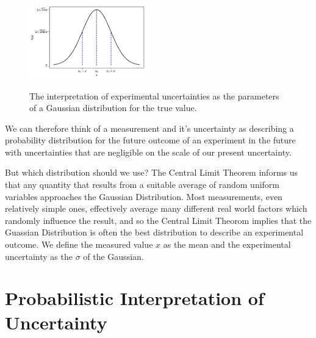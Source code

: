 \documentclass[12pt,oneside]{book}
\begin{document}
\begin{figure}[htbp]
\begin{center}
{\includegraphics[width=0.45\textwidth]{figs/stdunc.pdf}}
\end{center}
\caption{\label{fig:stdunc}  The interpretation of experimental uncertainties as the parameters of a Gaussian distribution for the true value.}
\end{figure}

We can therefore think of a measurement and it's uncertainty as
describing a probability distribution for the future outcome of an
experiment in the future with uncertainties that are negligible on the
scale of our present uncertainty.

But which distribution should we use?  The Central Limit Theorem
informs us that any quantity that results from a suitable average of
random uniform variables approaches the Gaussian Distribution.  Most
measurements, even relatively simple ones, effectively average many
different real world factors which randomly influence the result, and
so the Central Limit Theorom implies that the Guassian Distribution is
often the best distribution to describe an experimental outcome.  We
define the measured value $x$ as the mean and the experimental
uncertainty as the $\sigma$ of the Gaussian.

\section{Probabilistic Interpretation of Uncertainty}
\end{document}
